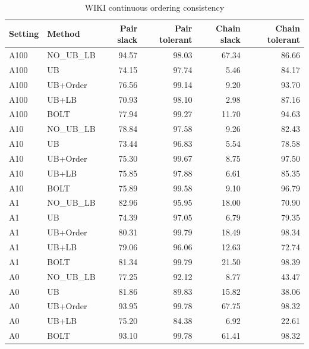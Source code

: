 \begin{table}[H]
\centering
\small
\setlength{\tabcolsep}{5pt}
\caption{WIKI continuous ordering consistency}
\label{tab:C_legacy_order_WIKI}
\begin{tabular}{@{}llrrrr@{}}
\toprule
Setting & Method & Pair slack & Pair tolerant & Chain slack & Chain tolerant \\
\midrule
A100 & NO\_UB_LB & 94.57 & 98.03 & 67.34 & 86.66 \\
A100 & UB & 74.15 & 97.74 & 5.46 & 84.17 \\
A100 & UB+Order & 76.56 & 99.14 & 9.20 & 93.70 \\
A100 & UB+LB & 70.93 & 98.10 & 2.98 & 87.16 \\
A100 & BOLT & 77.94 & 99.27 & 11.70 & 94.63 \\
A10 & NO\_UB_LB & 78.84 & 97.58 & 9.26 & 82.43 \\
A10 & UB & 73.44 & 96.83 & 5.54 & 78.58 \\
A10 & UB+Order & 75.30 & 99.67 & 8.75 & 97.50 \\
A10 & UB+LB & 75.85 & 97.88 & 6.61 & 85.35 \\
A10 & BOLT & 75.89 & 99.58 & 9.10 & 96.79 \\
A1 & NO\_UB_LB & 82.96 & 95.95 & 18.00 & 70.90 \\
A1 & UB & 74.39 & 97.05 & 6.79 & 79.35 \\
A1 & UB+Order & 80.31 & 99.79 & 18.49 & 98.34 \\
A1 & UB+LB & 79.06 & 96.06 & 12.63 & 72.74 \\
A1 & BOLT & 81.34 & 99.79 & 21.50 & 98.39 \\
A0 & NO\_UB_LB & 77.25 & 92.12 & 8.77 & 43.47 \\
A0 & UB & 81.86 & 89.83 & 15.82 & 38.06 \\
A0 & UB+Order & 93.95 & 99.78 & 67.75 & 98.32 \\
A0 & UB+LB & 75.20 & 84.38 & 6.92 & 22.61 \\
A0 & BOLT & 93.10 & 99.78 & 61.41 & 98.32 \\
\bottomrule
\end{tabular}
\end{table}
